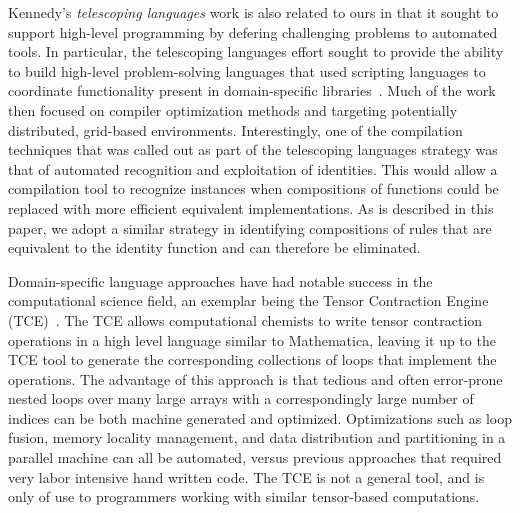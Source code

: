 Kennedy's \emph{telescoping languages} work is also related to ours in
that it sought to support high-level programming by defering
challenging problems to automated tools.  In particular, the
telescoping languages effort sought to provide the ability to build
high-level problem-solving languages that used scripting languages to
coordinate functionality present in domain-specific
libraries~\cite{kennedy00telescoping}. Much of the work then focused
on compiler optimization methods and targeting potentially
distributed, grid-based environments. Interestingly, one of the
compilation techniques that was called out as part of the telescoping
languages strategy was that of automated recognition and exploitation
of identities. This would allow a compilation tool to recognize
instances when compositions of functions could be replaced with more
efficient equivalent implementations. As is described in this paper,
we adopt a similar strategy in identifying compositions of rules that
are equivalent to the identity function and can therefore be
eliminated.

Domain-specific language approaches have had notable success in the
computational science field, an exemplar being the Tensor Contraction
Engine (TCE)~\cite{baumgartner05synthesis}. The TCE allows
computational chemists to write tensor contraction operations in a
high level language similar to Mathematica, leaving it up to the TCE
tool to generate the corresponding collections of loops that implement
the operations. The advantage of this approach is that tedious and
often error-prone nested loops over many large arrays with a
correspondingly large number of indices can be both machine generated
and optimized. Optimizations such as loop fusion, memory locality
management, and data distribution and partitioning in a parallel
machine can all be automated, versus previous approaches that required
very labor intensive hand written code. The TCE is not a general tool,
and is only of use to programmers working with similar tensor-based
computations.


% 
% 
% 
% 
% 
